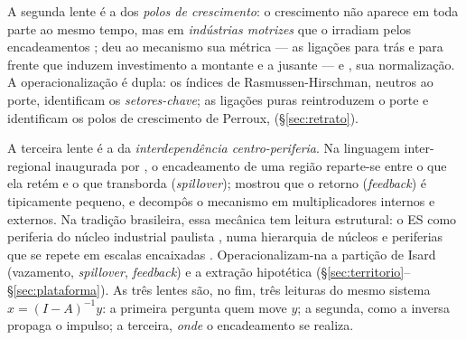 \documentclass[11pt,a4paper]{article}
\begin{document}
A segunda lente é a dos \emph{polos de crescimento}: o crescimento não aparece em toda
parte ao mesmo tempo, mas em \emph{indústrias motrizes} que o irradiam pelos encadeamentos
\citep{perroux1955}; \citet{hirschman1958} deu ao mecanismo sua métrica --- as ligações
para trás e para frente que induzem investimento a montante e a jusante --- e
\citet{rasmussen1956}, sua normalização. A operacionalização é dupla: os índices de
Rasmussen-Hirschman, neutros ao porte, identificam os \emph{setores-chave}; as ligações
puras \citep{cella1984,guilhoto2005linkages} reintroduzem o porte e identificam os polos de crescimento de Perroux,  (\S\ref{sec:retrato}).

A terceira lente é a da \emph{interdependência centro-periferia}. Na linguagem
inter-regional inaugurada por \citet{isard1951}, o encadeamento de uma região reparte-se entre o que ela retém e o que transborda (\emph{spillover}); \citet{miller1966} mostrou que o retorno (\emph{feedback}) é tipicamente pequeno, e \citet{miyazawa1966} decompôs o mecanismo em multiplicadores internos e externos. Na tradição brasileira, essa mecânica tem leitura estrutural: o ES como periferia do núcleo industrial paulista \citep{cano1985}, numa hierarquia de núcleos e periferias que se repete em escalas encaixadas \citep{friedmann1966}. Operacionalizam-na a partição de Isard (vazamento, \emph{spillover}, \emph{feedback}) e a extração hipotética \citep{dietzenbacher1993} (\S\ref{sec:territorio}--\S\ref{sec:plataforma}). As três lentes
são, no fim, três leituras do mesmo sistema $x=(I-A)^{-1}y$: a primeira pergunta quem move $y$; a segunda, como a inversa propaga o impulso; a terceira, \emph{onde} o
encadeamento se realiza.
\end{document}
